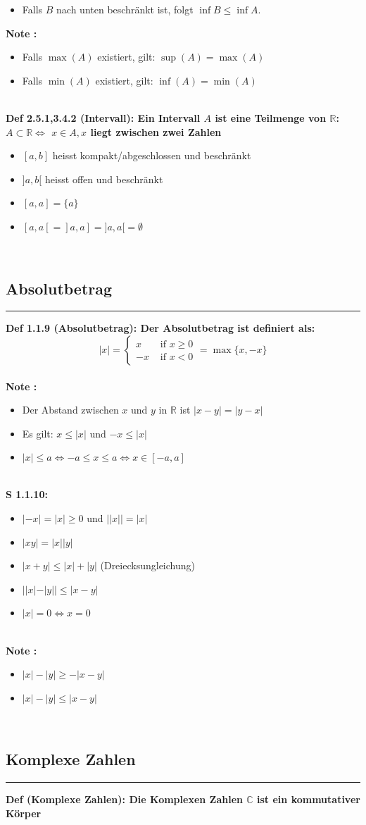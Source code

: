 \documentclass[7pt,landscape, margin = 0.1mm]{article}
\newcommand*{\mysubsection}[1]{\vspace{-2mm}\color{chaptercolor}\subsection{ #1 }
\vspace{-1mm}\hrule\vspace{1.5mm}\color{black}
\vspace{2mm}}
\newcommand{\DEF}[2]{\color{chaptercolor}\bf{Def #1}:\color{black}    \hspace{0.2cm} #2 \\}
\newcommand{\NOTE}[2]{\color{chaptercolor}\bf{Note #1}:\color{black}    \hspace{0.2cm} #2 \\}
\newcommand{\SA}[2]{\color{chaptercolor}\bf{S #1}:\color{black}    \hspace{0.2cm} #2 \\}
\begin{document}
\begin{multicols}{4}
\begin{flushleft}
{\begin{itemize}
\item[(ii)]Falls $B$ nach unten beschränkt ist, folgt $\inf B \leqslant \inf A$.
\end{itemize}}
\NOTE{}{\begin{itemize}
\item Falls $\max(A)$ existiert, gilt: $\sup(A) = \max(A)$
\item Falls $\min(A)$ existiert, gilt: $\inf(A) = \min(A)$
\end{itemize}}
\DEF{2.5.1,3.4.2 (Intervall)}{
Ein Intervall $A$ ist eine Teilmenge von $\mathbb{R}$: $A \subset \mathbb{R} \Leftrightarrow$ $x \in A, x$ liegt zwischen zwei Zahlen
\begin{itemize}
\item $[a,b]$ heisst kompakt/abgeschlossen und beschränkt
\item $]a,b[$ heisst offen und beschränkt
\item $[a,a] = \{a \}$
\item $[a,a[ = ]a,a] = ]a,a[ = \emptyset$
\end{itemize}
 }
 \mysubsection{Absolutbetrag}
 \DEF{1.1.9 (Absolutbetrag)}{
 Der Absolutbetrag ist definiert als:
  $$
  \left|x \right| = \begin{cases}x & \text{ if } x \geq 0 \\-x & \text{ if } x < 0\end{cases} = \max \{x,-x\}
   $$   
}
\NOTE{}{\begin{itemize}
\item Der Abstand zwischen $x$ und $y$ in $\mathbb{R}$ ist $|x-y|=|y-x|$
\item Es gilt: $x \leq |x|$  und $-x \leq |x|$
\item $|x| \leq a \Leftrightarrow -a \leq x  \leq a  \Leftrightarrow x \in [-a,a]$
\end{itemize} }
\SA{1.1.10}{\begin{itemize}
\item[1.] $|-x| = |x| \geq 0$ und $||x|| = |x|$
\item[2.] $|xy|=|x||y|$
\item[3.] $|x+y| \leq |x|+|y|$ (Dreiecksungleichung)
\item[4.] $||x|-|y|| \leq |x-y|$
\item[5.] $|x|=0 \Leftrightarrow x=0$ 
\end{itemize}}
\NOTE{}{
\begin{itemize}
\item $|x|-|y| \geq -|x-y|$
\item $|x|-|y| \leq |x-y|$
\end{itemize}}
\mysubsection{Komplexe Zahlen}
\DEF{(Komplexe Zahlen)}{Die Komplexen Zahlen $\mathbb{C}$ ist ein kommutativer Körper

}
\end{flushleft}
\end{multicols}
\end{document}
